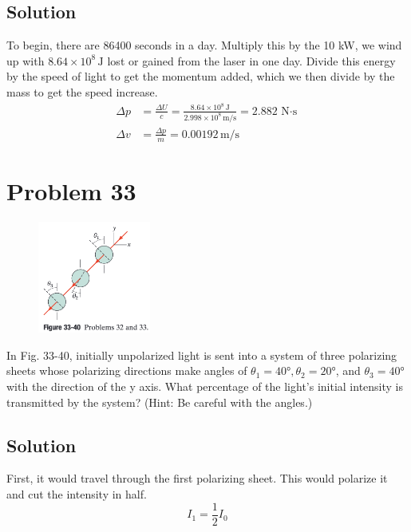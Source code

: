\documentclass[12pt]{article}
\newcommand{\E}[1]{\times 10^{#1}}
\begin{document}
        \subsection{Solution}
            To begin, there are 86400 seconds in a day.
            Multiply this by the 10 kW, we wind up with $8.64\E{8}\,\unit{\joule}$ lost or gained from the laser in one day.
            Divide this energy by the speed of light to get the momentum added, which we then divide by the mass to get the speed increase.
            \begin{align}
                \Delta p    &=  \frac{\Delta U}{c}
                    =   \frac{8.64\E{8}\,\unit{\joule}}{2.998\E{8}\,\unit{\meter/\second}}
                    =   2.882\,\unit{\newton\cdot\second}\\
                \Delta v    &=  \frac{\Delta p}{m}
                    =   \boxed{0.00192\,\unit{\meter/\second}}
            \end{align}

    \pagebreak
    \section{Problem 33}
        \begin{figure}
            \vspace{-30pt}
            \includegraphics[width=0.33\textwidth]{33-40.png} 
        \end{figure}
        In Fig. 33-40, initially unpolarized light is sent into a system of three polarizing sheets whose polarizing directions make angles of $\theta_1 = 40\unit{\degree}, \theta_2 = 20\unit{\degree}$, and $\theta_3 = 40\unit{\degree}$ with the direction of the y axis. 
        What percentage of the light's initial intensity is transmitted by the system? 
        (Hint: Be careful with the angles.)

        \subsection{Solution}
            First, it would travel through the first polarizing sheet.
            This would polarize it and cut the intensity in half.
            \begin{equation}
                I_1 = \frac{1}{2}I_0
            \end{equation}
\end{document}
